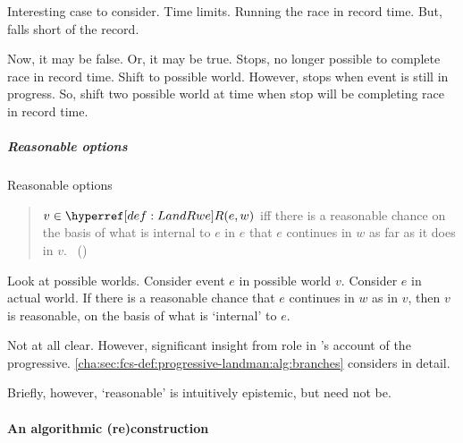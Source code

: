 \begin{note}
  Interesting case to consider.
  Time limits.
  Running the race in record time.
  But, falls short of the record.

  Now, it may be false.
  Or, it may be true.
  Stops, no longer possible to complete race in record time.
  Shift to possible world.
  However, stops when event is still in progress.
  So, shift two possible world at time when stop will be completing race in record time.
\end{note}

\subparagraph{Reasonable options}

\begin{note}
  Reasonable options
  \begin{quote}
    \label{def:LandRwe}
    \(v \in \lRwe{w}{e}\) iff there is a reasonable chance on the basis of what is internal to \(e\) in \(e\) that \(e\) continues in \(w\) as far as it does in \(v\).%
    \mbox{ }\hfill\mbox{(\citeyear[26]{Landman:1992wh})}
  \end{quote}

  Look at possible worlds.
  Consider event \(e\) in possible world \(v\).
  Consider \(e\) in actual world.
  If there is a reasonable chance that \(e\) continues in \(w\) as in \(v\), then \(v\) is reasonable, on the basis of what is `internal' to \(e\).

  Not at all clear.
  However, significant insight from role in \citeauthor{Landman:1992wh}'s account of the progressive.
  \autoref{cha:sec:fcs-def:progressive-landman:alg:branches} considers in detail.

  Briefly, however, `reasonable' is intuitively epistemic, but need not be.
\end{note}

\paragraph{An algorithmic (re)construction}
\label{cha:sec:fcs-def:progressive-landman:alg}
\nocite{Cormen:2009uw}

